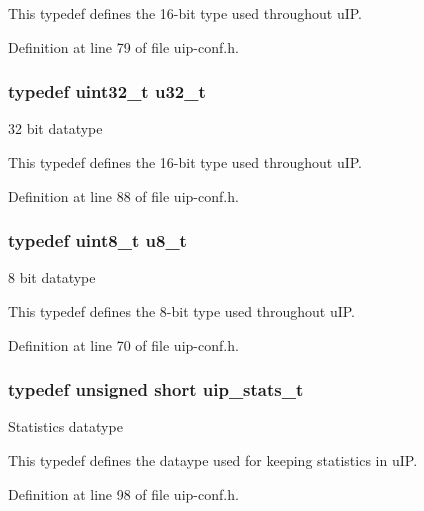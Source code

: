 This typedef defines the 16-\/bit type used throughout uIP. 

Definition at line 79 of file uip-\/conf.h.

\hypertarget{group__uipfw_ga4c14294869aceba3ef9d4c0c302d0f33}{
\subsubsection[{u32\_\-t}]{\setlength{\rightskip}{0pt plus 5cm}typedef uint32\_\-t {\bf u32\_\-t}}}
\label{group__uipfw_ga4c14294869aceba3ef9d4c0c302d0f33}
32 bit datatype

This typedef defines the 16-\/bit type used throughout uIP. 

Definition at line 88 of file uip-\/conf.h.

\hypertarget{group__uipfw_ga4caecabca98b43919dd11be1c0d4cd8e}{
\subsubsection[{u8\_\-t}]{\setlength{\rightskip}{0pt plus 5cm}typedef uint8\_\-t {\bf u8\_\-t}}}
\label{group__uipfw_ga4caecabca98b43919dd11be1c0d4cd8e}
8 bit datatype

This typedef defines the 8-\/bit type used throughout uIP. 

Definition at line 70 of file uip-\/conf.h.

\hypertarget{group__uipfw_ga727459e5c4f777543c81ffffa3df3f0c}{
\subsubsection[{uip\_\-stats\_\-t}]{\setlength{\rightskip}{0pt plus 5cm}typedef unsigned short {\bf uip\_\-stats\_\-t}}}
\label{group__uipfw_ga727459e5c4f777543c81ffffa3df3f0c}
Statistics datatype

This typedef defines the dataype used for keeping statistics in uIP. 

Definition at line 98 of file uip-\/conf.h.



